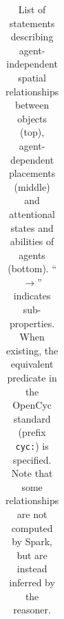 \documentclass[preprint,3p,times]{elsarticle}
\newcommand{\concept}[1]{{\small \texttt{#1}}}
\newcommand{\stmt}[1]{{\footnotesize\tt$\langle$#1\relax$\rangle$}}
\newcommand{\eg}{{e.g.\xspace}}
\begin{document}
\begin{table}[h]
\begin{tabular}{p{1.5cm}lp{2cm}p{3.7cm}}
	\end{tabular}

    \caption{List of statements describing agent-independent spatial
        relationships between objects (top), agent-dependent placements (middle)
        and attentional states and abilities of agents (bottom).
        ``$\rightarrow$'' indicates sub-properties. When existing, the
        equivalent predicate in the {\sc OpenCyc} standard (prefix \concept{cyc:})
        is specified. Note that some relationships are not computed by {\sc Spark}, but
        are instead inferred by the reasoner.}

	\label{facts}
\end{table}
\renewcommand{\concept}[1]{{\small \texttt{#1}}}

%
%
%
%
\end{document}
